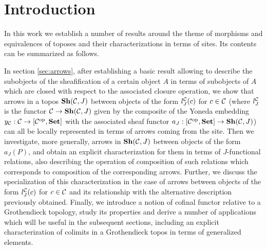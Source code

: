\documentclass[a4paper,12pt]{article}
\begin{document}
\newcommand{\mono}%
 {\rightarrowtail}

\newcommand{\ob}%
 {{\rm ob}}
 
 \newcommand{\Hom}%
 {{\rm Hom}}

\newcommand{\op}%
 {^{\rm op}}

\newcommand{\Set}%
 {{\bf Set }}

\newcommand{\Sh}%
 {{\bf Sh}}

\newcommand{\sh}%
 {{\bf sh}}

\newcommand{\Sub}%
 {{\rm Sub}}

\tableofcontents

\section{Introduction}\label{intro}

In this work we establish a number of results around the theme of morphisms and equivalences of toposes and their characterizations in terms of sites. Its contents can be summarized as follows.

In section \ref{sec:arrows}, after establishing a basic result allowing to describe the subobjects of the sheafification of a certain object $A$ in terms of subobjects of $A$ which are closed with respect to the associated closure operation, we show that arrows in a topos $\Sh({\cal C}, J)$ between objects of the form $l_{J}^{{\cal C}}(c)$ for $c\in {\cal C}$ (where $l_{J}^{{\cal C}}$ is the functor ${\cal C}\to \Sh({\cal C}, J)$ given by the composite of the Yoneda embedding $y_{\cal C}:{\cal C}\to [{\cal C}^\textup{op}, \Set]$ with the associated sheaf functor $a_{J}:[{\cal C}^\textup{op}, \Set] \to \Sh({\cal C}, J)$) can all be locally represented in terms of arrows coming from the site. Then we investigate, more generally, arrows in $\Sh({\cal C}, J)$ between objects of the form $a_{J}(P)$, and obtain an explicit characterization for them in terms of $J$-functional relations, also describing the operation of composition of such relations which corresponds to composition of the corresponding arrows. Further, we discuss the specialization of this characterization in the case of arrows between objects of the form $l_{J}^{{\cal C}}(c)$ for $c\in {\cal C}$ and its relationship with the alternative description previously obtained. Finally, we introduce a notion of cofinal functor relative to a Grothendieck topology, study its properties and derive a number of applications which will be useful in the subsequent sections, including an explicit characterization of colimits in a Grothendieck topos in terms of generalized elements. 
\end{document}
